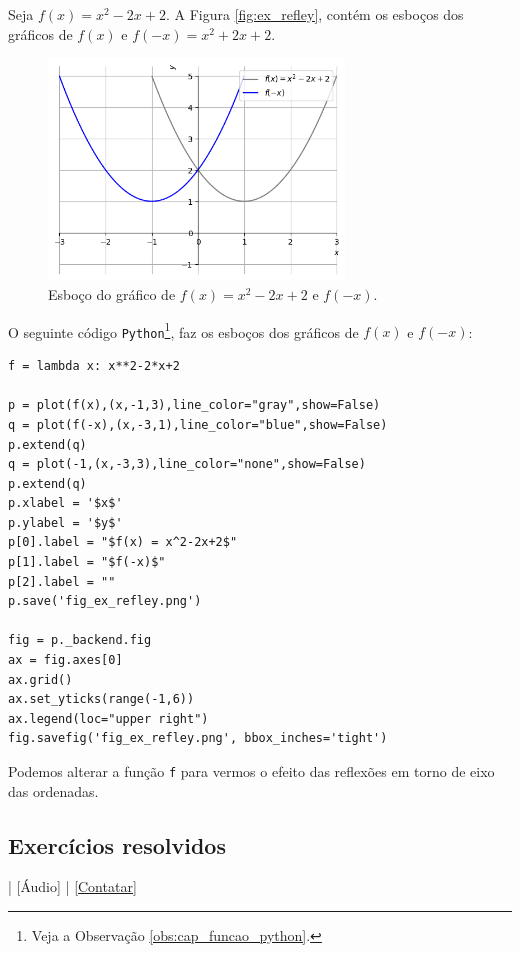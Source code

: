 \begin{ex}
  Seja $f(x) = x^2-2x+2$. A Figura \ref{fig:ex_refley}, contém os esboços dos gráficos de $f(x)$ e $f(-x) = x^2+2x+2$.

  \begin{figure}[H]
    \centering
    \includegraphics[width=0.7\textwidth]{./cap_funcao/dados/fig_ex_refley/fig_ex_refley}
    \caption{Esboço do gráfico de $f(x) = x^2-2x+2$ e $f(-x)$.}
    \label{fig:ex_reflex}
  \end{figure}

  \ifispython
  O seguinte código \verb+Python+\footnote{Veja a Observação \ref{obs:cap_funcao_python}.}, faz os esboços dos gráficos de $f(x)$ e $f(-x)$:
\begin{verbatim}
f = lambda x: x**2-2*x+2

p = plot(f(x),(x,-1,3),line_color="gray",show=False)
q = plot(f(-x),(x,-3,1),line_color="blue",show=False)
p.extend(q)
q = plot(-1,(x,-3,3),line_color="none",show=False)
p.extend(q)
p.xlabel = '$x$'
p.ylabel = '$y$'
p[0].label = "$f(x) = x^2-2x+2$"
p[1].label = "$f(-x)$"
p[2].label = ""
p.save('fig_ex_refley.png')

fig = p._backend.fig
ax = fig.axes[0]
ax.grid()
ax.set_yticks(range(-1,6))
ax.legend(loc="upper right")
fig.savefig('fig_ex_refley.png', bbox_inches='tight')
\end{verbatim}
  Podemos alterar a função \verb+f+ para vermos o efeito das reflexões em torno de eixo das ordenadas.
  \fi
\end{ex}

\subsection*{Exercícios resolvidos}

\begin{flushright}
  [Vídeo] | [Áudio] | \href{https://phkonzen.github.io/notas/contato.html}{[Contatar]}
\end{flushright}

